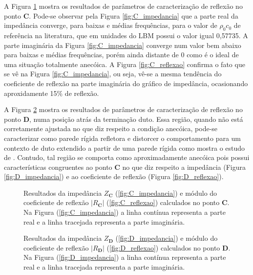 \newpage
A Figura \ref{fig:resultados_C} mostra os resultados de parâmetros de caracterização de reflexão no ponto \textbf{C}. Pode-se observar pela Figura \ref{fig:C_impedancia} que a parte real da impedância converge, para baixas e médias frequências, para o valor de $\rho_{0} c_{0}$ de referência na literatura, que em unidades do LBM possui o valor igual 0,57735. A parte imaginária da Figura \ref{fig:C_impedancia} converge num valor bem abaixo para baixas e médias frequências, porém ainda distante de 0 como é o ideal de uma situação totalmente anecóica. A Figura \ref{fig:C_reflexao} confirma o fato que se vê na Figura \ref{fig:C_impedancia}, ou seja, vê-se a mesma tendência do coeficiente de reflexão na parte imaginária do gráfico de impedância, ocasionando aproxidamente 15\% de reflexão.

A Figura \ref{fig:resultados_D} mostra os resultados de parâmetros de caracterização de reflexão no ponto \textbf{D}, numa posição atrás da terminação duto. Essa região, quando não está corretamente ajustada no que diz respeito a condição anecóica, pode-se caracterizar como parede rígida refletora e distorcer o comportamento para um contexto de duto extendido a partir de uma parede rígida como mostra o estudo de . Contudo, tal região se comporta como aproximadamente anecóica pois possui características congruentes ao ponto \textbf{C} no que diz respeito a impedância (Figura \ref{fig:D_impedancia}) e ao coeficiente de reflexão (Figura \ref{fig:D_reflexao}).

\begin{figure}
\begin{subfigure}{\scaleA \textwidth}
  
\end{subfigure}%
\begin{subfigure}{\scaleA \textwidth}
  
\end{subfigure}
\caption[Resultados de reflexão no ponto \textbf{C}]{Resultados da impedância $Z_{\textbf{C}}$ (\ref{fig:C_impedancia}) e módulo do coeficiente de reflexão $|R_{\textbf{C}}|$ (\ref{fig:C_reflexao}) calculados no ponto $\textbf{C}$. Na Figura (\ref{fig:C_impedancia}) a linha contínua representa a parte real e a linha tracejada representa a parte imaginária.}
\label{fig:resultados_C}
\end{figure}

\begin{figure}
\begin{subfigure}{\scaleA \textwidth}
  
\end{subfigure}%
\begin{subfigure}{\scaleA \textwidth}
  
\end{subfigure}
\caption[Resultados de reflexão no ponto \textbf{D}]{Resultados da impedância $Z_{\textbf{D}}$ (\ref{fig:D_impedancia}) e módulo do coeficiente de reflexão $|R_{\textbf{D}}|$ (\ref{fig:D_reflexao}) calculados no ponto $\textbf{D}$. Na Figura (\ref{fig:D_impedancia}) a linha contínua representa a parte real e a linha tracejada representa a parte imaginária.}
\label{fig:resultados_D}
\end{figure}

